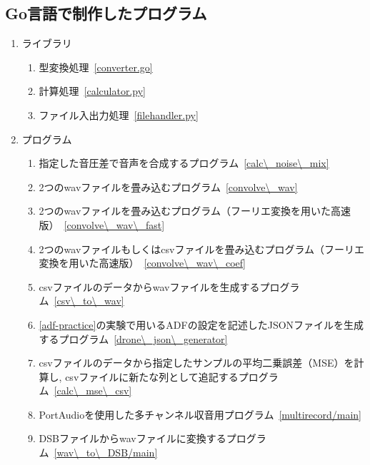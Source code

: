 \subsection{Go言語で制作したプログラム}\label{go}

\begin{enumerate}
\renewcommand{\labelenumi}{(\arabic{enumi})}
\tightlist

\item
  ライブラリ \\
  \begin{enumerate}
  \renewcommand{\labelenumi}{(\arabic{enumi})}
  \tightlist
  \item
    型変換処理\ \ref{converter.go}

  \item
    計算処理\  \ref{calculator.py}

  \item
    ファイル入出力処理\ \ref{filehandler.py}
  \end{enumerate}

\item
  プログラム

  \begin{enumerate}
  \renewcommand{\labelenumi}{(\arabic{enumi})}

  \item
    指定した音圧差で音声を合成するプログラム\ \ref{calc\_noise\_mix}

  \item
    2つのwavファイルを畳み込むプログラム\ \ref{convolve\_wav}

  \item
    2つのwavファイルを畳み込むプログラム（フーリエ変換を用いた高速版）\ \ref{convolve\_wav\_fast}

  \item
    2つのwavファイルもしくはcsvファイルを畳み込むプログラム（フーリエ変換を用いた高速版）\ \ref{convolve\_wav\_coef}

  \item
    csvファイルのデータからwavファイルを生成するプログラム\ \ref{csv\_to\_wav}

  \item
    \ref{adf-practice}の実験で用いるADFの設定を記述したJSONファイルを生成するプログラム\ \ref{drone\_json\_generator}

  \item
    csvファイルのデータから指定したサンプルの平均二乗誤差（MSE）を計算し, csvファイルに新たな列として追記するプログラム\ \ref{calc\_mse\_csv}

  \item
    PortAudioを使用した多チャンネル収音用プログラム\ \ref{multirecord/main}

  \item
    DSBファイルからwavファイルに変換するプログラム\ \ref{wav\_to\_DSB/main}
  \end{enumerate}
\end{enumerate}



